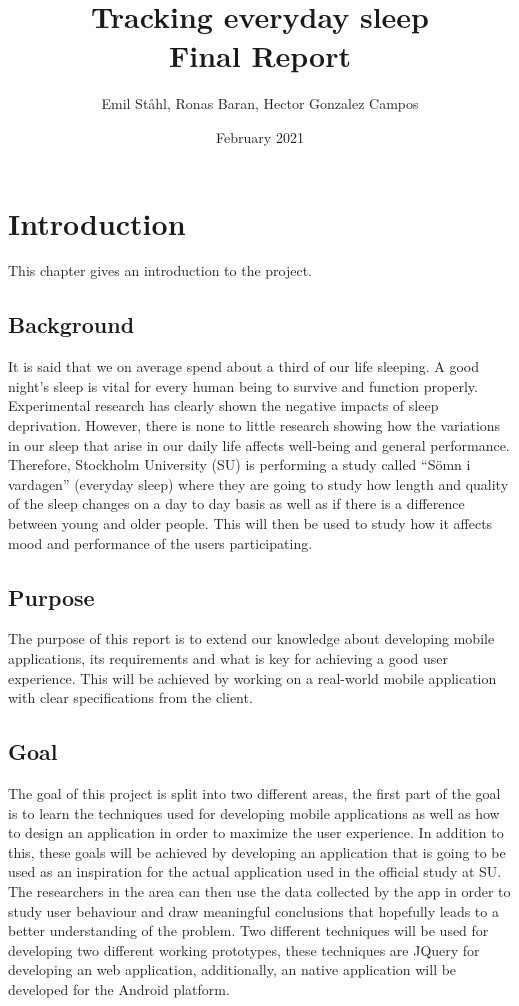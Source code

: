 \documentclass{article}
\title{Tracking everyday sleep \\ Final Report}
\author{Emil Ståhl, Ronas Baran, Hector Gonzalez Campos}
\date{February 2021}
\begin{document}
\maketitle

\section{Introduction}
This chapter gives an introduction to the project.

\subsection{Background}
It is said that we on average spend about a third of our life sleeping.  A good night's sleep is vital for every human being to survive and function properly. Experimental research has clearly shown the negative impacts of sleep deprivation.\cite{ohlmann_costs_2009} However, there is none to little research showing how the variations in our sleep that arise in our daily life affects well-being and general performance. Therefore, Stockholm University (SU) is performing a study called “Sömn i vardagen” (everyday sleep) where they are going to study how length and quality of the sleep changes on a day to day basis as well as if there is a difference between young and older people. This will then be used to study how it affects mood and performance of the users participating.\cite{schwarz_anslag_nodate}

\subsection{Purpose}
The purpose of this report is to extend our knowledge about developing mobile applications, its requirements and what is key for achieving a good user experience. This will be achieved by working on a real-world mobile application with clear specifications from the client. 

\subsection{Goal}
The goal of this project is split into two different areas, the first part of the goal is to learn the techniques used for developing mobile applications as well as how to design an application in order to maximize the user experience. In addition to this, these goals will be achieved by developing an application that is going to be used as an inspiration for the actual application used in the official study at SU. The researchers in the area can then use the data collected by the app in order to study user behaviour and draw meaningful conclusions that hopefully leads to a better understanding of the problem. Two different techniques will be used for developing two different working prototypes, these techniques are JQuery for developing an web application, additionally, an native application will be developed for the Android platform. 
\end{document}
